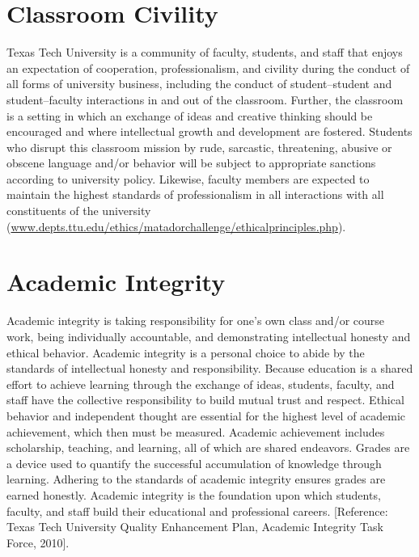 \documentclass[12pt, notitlepage]{article}   	%
\begin{document}
{\section{Classroom Civility}
Texas Tech University is a community of faculty, students, and staff that enjoys 
an expectation of cooperation, professionalism, and civility during the conduct of all 
forms of university business, including the conduct of student–student and student–faculty 
interactions in and out of the classroom. 
Further, the classroom is a setting in which an exchange of ideas and creative thinking 
should be encouraged and where intellectual growth and development are fostered. 
Students who disrupt this classroom mission by rude, sarcastic, threatening, abusive or 
obscene language and/or behavior will be subject to appropriate sanctions according to 
university policy.  Likewise, faculty members are expected to maintain the 
highest standards of professionalism in all interactions with all constituents of the 
university (\url{www.depts.ttu.edu/ethics/matadorchallenge/ethicalprinciples.php}).

\section{Academic Integrity}
Academic integrity is taking responsibility for one’s own class and/or course work, 
being individually accountable, and demonstrating intellectual honesty and ethical behavior. 
Academic integrity is a personal choice to abide by the standards of intellectual honesty 
and responsibility. 
Because education is a shared effort to achieve learning through the exchange of ideas, 
students, faculty, and staff have the collective responsibility to build mutual trust and respect. 
Ethical behavior and independent thought are essential for the highest level of academic 
achievement, which then must be measured. 
Academic achievement includes scholarship, teaching, and learning, all of which are shared endeavors. 
Grades are a device used to quantify the successful accumulation of knowledge through learning. 
Adhering to the standards of academic integrity ensures grades are earned honestly. 
Academic integrity is the foundation upon which students, faculty, and staff build their 
educational and professional careers. [Reference: Texas Tech University Quality 
Enhancement Plan, Academic Integrity Task Force, 2010].

}
\end{document}
